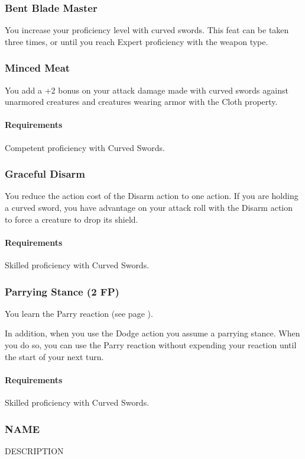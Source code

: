 \subsubsection{Bent Blade Master} \label{feat::bentblademaster}
    You increase your proficiency level with curved swords.
    This feat can be taken three times, or until you reach Expert proficiency with the weapon type.
\subsubsection{Minced Meat} \label{feat::mincedmeat}
    You add a +2 bonus on your attack damage made with curved swords against unarmored creatures and creatures wearing armor with the Cloth property.
    \paragraph{Requirements} Competent proficiency with Curved Swords.
\subsubsection{Graceful Disarm} \label{feat::gracefuldisarm}
    You reduce the action cost of the Disarm action to one action.
    If you are holding a curved sword, you have advantage on your attack roll with the Disarm action to force a creature to drop its shield.
    \paragraph{Requirements} Skilled proficiency with Curved Swords.
\subsubsection{Parrying Stance (2 FP)} \label{feat::parryingstance}
    You learn the Parry reaction (see page \pageref{act::parry}).

    In addition, when you use the Dodge action you assume a parrying stance.
    When you do so, you can use the Parry reaction without expending your reaction until the start of your next turn.
    \paragraph{Requirements} Skilled proficiency with Curved Swords.
\subsubsection{NAME} \label{feat::name}
    DESCRIPTION

